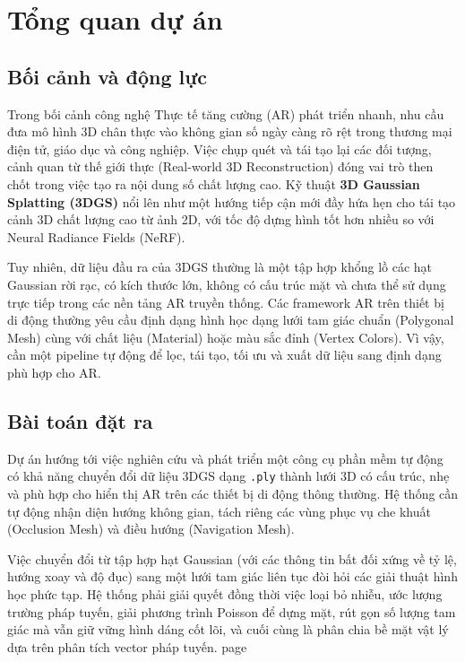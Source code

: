 \documentclass[a4paper,12pt]{report}
\begin{document}
\chapter{Tổng quan dự án}

\section{Bối cảnh và động lực}
Trong bối cảnh công nghệ Thực tế tăng cường (AR) phát triển nhanh, nhu cầu đưa mô hình 3D chân thực vào không gian số ngày càng rõ rệt trong thương mại điện tử, giáo dục và công nghiệp. Việc chụp quét và tái tạo lại các đối tượng, cảnh quan từ thế giới thực (Real-world 3D Reconstruction) đóng vai trò then chốt trong việc tạo ra nội dung số chất lượng cao. Kỹ thuật \textbf{3D Gaussian Splatting (3DGS)} nổi lên như một hướng tiếp cận mới đầy hứa hẹn cho tái tạo cảnh 3D chất lượng cao từ ảnh 2D, với tốc độ dựng hình tốt hơn nhiều so với Neural Radiance Fields (NeRF).

Tuy nhiên, dữ liệu đầu ra của 3DGS thường là một tập hợp khổng lồ các hạt Gaussian rời rạc, có kích thước lớn, không có cấu trúc mặt và chưa thể sử dụng trực tiếp trong các nền tảng AR truyền thống. Các framework AR trên thiết bị di động thường yêu cầu định dạng hình học dạng lưới tam giác chuẩn (Polygonal Mesh) cùng với chất liệu (Material) hoặc màu sắc đỉnh (Vertex Colors). Vì vậy, cần một pipeline tự động để lọc, tái tạo, tối ưu và xuất dữ liệu sang định dạng phù hợp cho AR.

\section{Bài toán đặt ra}
Dự án hướng tới việc nghiên cứu và phát triển một công cụ phần mềm tự động có khả năng chuyển đổi dữ liệu 3DGS dạng \texttt{.ply} thành lưới 3D có cấu trúc, nhẹ và phù hợp cho hiển thị AR trên các thiết bị di động thông thường. Hệ thống cần tự động nhận diện hướng không gian, tách riêng các vùng phục vụ che khuất (Occlusion Mesh) và điều hướng (Navigation Mesh).

Việc chuyển đổi từ tập hợp hạt Gaussian (với các thông tin bất đối xứng về tỷ lệ, hướng xoay và độ đục) sang một lưới tam giác liên tục đòi hỏi các giải thuật hình học phức tạp. Hệ thống phải giải quyết đồng thời việc loại bỏ nhiễu, ước lượng trường pháp tuyến, giải phương trình Poisson để dựng mặt, rút gọn số lượng tam giác mà vẫn giữ vững hình dáng cốt lõi, và cuối cùng là phân chia bề mặt vật lý dựa trên phân tích vector pháp tuyến.
page
\clearpage
\end{document}
